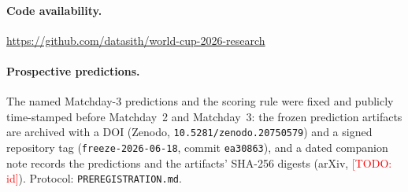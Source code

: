 \documentclass[11pt]{article}
\newcommand{\todo}[1]{\textcolor{red}{[TODO: #1]}}
\begin{document}
\paragraph{Code availability.} \url{https://github.com/datasith/world-cup-2026-research}
\paragraph{Prospective predictions.} The named Matchday-3 predictions and the scoring rule were
fixed and publicly time-stamped before Matchday~2 and Matchday~3: the frozen prediction artifacts
are archived with a DOI (Zenodo, \texttt{10.5281/zenodo.20750579}) and a signed repository tag
(\texttt{freeze-2026-06-18}, commit \texttt{ea30863}), and a dated companion note records the
predictions and the artifacts' SHA-256 digests (arXiv, \todo{id}). Protocol:
\texttt{PREREGISTRATION.md}.



\end{document}
